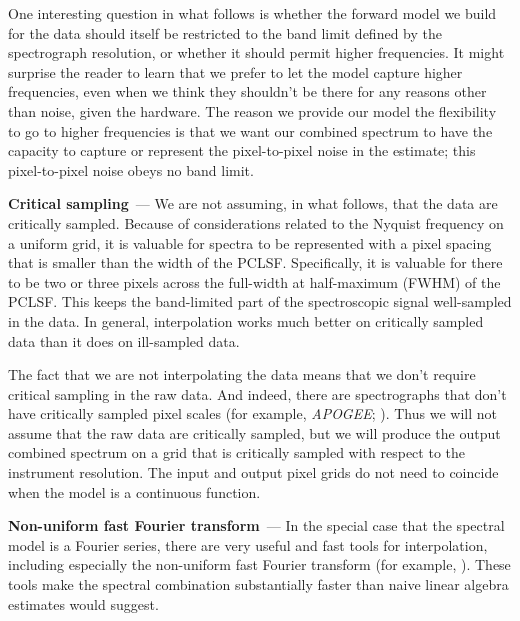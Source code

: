 \documentclass[modern, linenumbers]{aastex631}
\renewcommand{\paragraph}[1]{\medskip\par\noindent\textbf{#1}~---}
\begin{document}
One interesting question in what follows is whether the forward model we build for the data should itself be restricted to the band limit defined by the spectrograph resolution, or whether it should permit higher frequencies.
It might surprise the reader to learn that we prefer to let the model capture higher frequencies, even when we think they shouldn't be there for any reasons other than noise, given the hardware.
The reason we provide our model the flexibility to go to higher frequencies is that we want our combined spectrum to have the capacity to capture or represent the pixel-to-pixel noise in the estimate; this pixel-to-pixel noise obeys no band limit.

\paragraph{Critical sampling}
We are not assuming, in what follows, that the data are critically sampled.
Because of considerations related to the Nyquist frequency on a uniform grid, it is valuable for spectra to be represented with a pixel spacing that is smaller than the width of the PCLSF.
Specifically, it is valuable for there to be two or three pixels across the full-width at half-maximum (FWHM) of the PCLSF.
This keeps the band-limited part of the spectroscopic signal well-sampled in the data.
In general, interpolation works much better on critically sampled data than it does on ill-sampled data.

The fact that we are not interpolating the data means that we don't require critical sampling in the raw data.
And indeed, there are spectrographs that don't have critically sampled pixel scales (for example, \textsl{APOGEE}; \citealt{apogee}).
Thus we will not assume that the raw data are critically sampled, but we will produce the output combined spectrum on a grid that is critically sampled with respect to the instrument resolution.
The input and output pixel grids do not need to coincide when the model is a continuous function.

\paragraph{Non-uniform fast Fourier transform}
In the special case that the spectral model is a Fourier series, there are very useful and fast tools for interpolation, including especially the non-uniform fast Fourier transform (for example, \citealt{finufft}).
These tools make the spectral combination substantially faster than naive linear algebra estimates would suggest.
\end{document}
